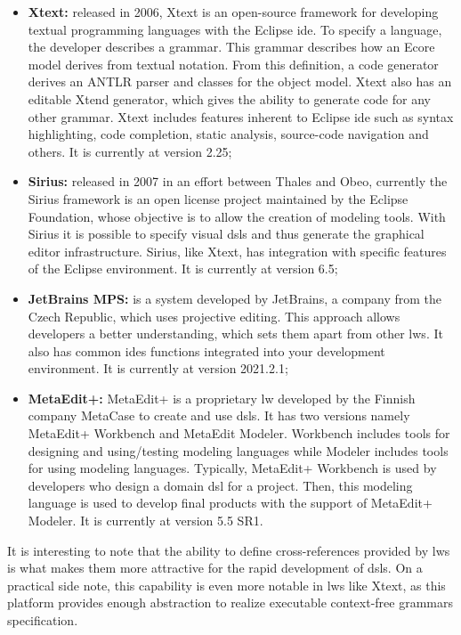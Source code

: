 \begin{itemize}
    \item \textbf{Xtext:} released in 2006, Xtext is an open-source framework for developing textual programming languages with the Eclipse \ac{ide}.
    To specify a language, the developer describes a grammar.
    This grammar describes how an Ecore model derives from textual notation.
    From this definition, a code generator derives an ANTLR parser and classes for the object model.
    Xtext also has an editable Xtend generator, which gives the ability to generate code for any other grammar.
    Xtext includes features inherent to Eclipse \ac{ide} such as syntax highlighting, code completion, static analysis, source-code navigation and others.
    It is currently at version 2.25;
    
    \item \textbf{Sirius:} released in 2007 in an effort between Thales and Obeo, currently the Sirius framework is an open license project maintained by the Eclipse Foundation, whose objective is to allow the creation of modeling tools.
    With Sirius it is possible to specify visual \acp{dsl} and thus generate the graphical editor infrastructure.
    Sirius, like Xtext, has integration with specific features of the Eclipse environment. It is currently at version 6.5;
    
    \item \textbf{JetBrains MPS:} is a system developed by JetBrains, a company from the Czech Republic, which uses projective editing.
    This approach allows developers a better understanding, which sets them apart from other \acp{lw}.
    It also has common \acp{ide} functions integrated into your development environment.
    It is currently at version 2021.2.1;
    
    \item \textbf{MetaEdit+:} MetaEdit+ is a proprietary \ac{lw} developed by the Finnish company MetaCase to create and use \acp{dsl}.
    It has two versions namely MetaEdit+ Workbench and MetaEdit Modeler.
    Workbench includes tools for designing and using/testing modeling languages while Modeler includes tools for using modeling languages.
    Typically, MetaEdit+ Workbench is used by developers who design a domain \ac{dsl} for a project.
    Then, this modeling language is used to develop final products with the support of MetaEdit+ Modeler.
    It is currently at version 5.5 SR1.
\end{itemize}

It is interesting to note that the ability to define cross-references provided by \acp{lw} is what makes them more attractive for the rapid development of \acp{dsl}. 
On a practical side note, this capability is even more notable in \acp{lw} like Xtext, as this platform provides enough abstraction to realize executable context-free grammars specification.

